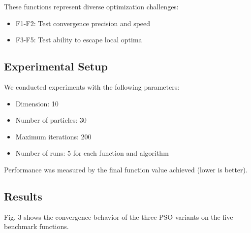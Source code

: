 \documentclass[conference]{IEEEtran}
\begin{document}
These functions represent diverse optimization challenges:
\begin{itemize}
    \item F1-F2: Test convergence precision and speed
    \item F3-F5: Test ability to escape local optima
\end{itemize}

\subsection{Experimental Setup}
We conducted experiments with the following parameters:
\begin{itemize}
    \item Dimension: 10
    \item Number of particles: 30
    \item Maximum iterations: 200
    \item Number of runs: 5 for each function and algorithm
\end{itemize}

Performance was measured by the final function value achieved (lower is better).

\subsection{Results}
Fig. 3 shows the convergence behavior of the three PSO variants on the five benchmark functions.
\end{document}
